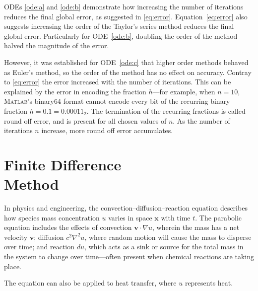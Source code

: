 \documentclass[a4paper,12pt,twocolumn]{article}
\begin{document}
ODEs \eqref{ode:a} and \eqref{ode:b} demonstrate how increasing the number of
iterations reduces the final global error, as suggested in \eqref{eq:error}.
Equation~\eqref{eq:error} also suggests increasing the order of the Taylor's
series method reduces the final global error. Particularly for
ODE~\eqref{ode:b}, doubling the order of the method halved the magnitude of the
error.

However, it was established for ODE~\eqref{ode:c} that higher order methods
behaved as Euler's method, so the order of the method has no effect on accuracy.
Contray to \eqref{eq:error} the error increased with the number of iterations.
This can be explained by the error in encoding the fraction $h$---for example,
when $n=10$, \textsc{Matlab}'s binary64 format cannot encode every bit of the
recurring binary fraction $h=0.1=0.0\dot{0}01\dot{1}_2$. The termination of the
recurring fractions is called round off error, and is present for all chosen
values of $n$. As the number of iterations $n$ increase, more round off error
accumulates.

\vspace{-\baselineskip}
\section{Finite Difference\\Method}

In physics and engineering, the convection--diffusion--reaction equation
describes how species mass concentration $u$ varies in space $\mathbf{x}$ with
time $t$. The parabolic equation includes the effects of convection
$\mathbf{v}\cdot\nabla u$, wherein the mass has a net velocity $\mathbf{v}$; 
diffusion $c^2\nabla^2u$, where random motion will cause the mass to disperse 
over time; and reaction $du$, which acts as a sink or source for the total mass 
in the system to change over time---often present when chemical reactions are 
taking place.

The equation can also be applied to heat transfer, where $u$ represents heat.
\end{document}
